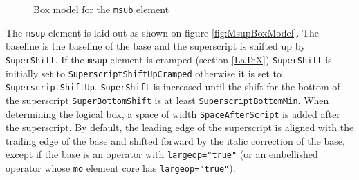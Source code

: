 \begin{figure}
\centering
\caption{Box model for the {\tt msub} element}
\label{fig:MsubBoxModel}
\end{figure}

The {\tt msup} element is laid out as shown on figure \ref{fig:MsupBoxModel}.
The baseline is the baseline of the base and the superscript is shifted up
by {\tt SuperShift}. If the {\tt msup} element is cramped
(section \ref{LaTeX})
{\tt SuperShift} is initially set to
{\tt SuperscriptShiftUpCramped} otherwise
it is set to {\tt SuperscriptShiftUp}.
{\tt SuperShift} is increased until the shift for the bottom of the superscript
{\tt SuperBottomShift} is at least
{\tt SuperscriptBottomMin}. When determining
the logical box, a space of width {\tt SpaceAfterScript}
is added after
the superscript. By default, the leading edge of the superscript is aligned with
the trailing edge of the base and shifted forward by the italic correction
of the base, except if the base is an operator with
{\tt largeop="true"} (or an embellished operator whose {\tt mo} element core
has {\tt largeop="true"}).

